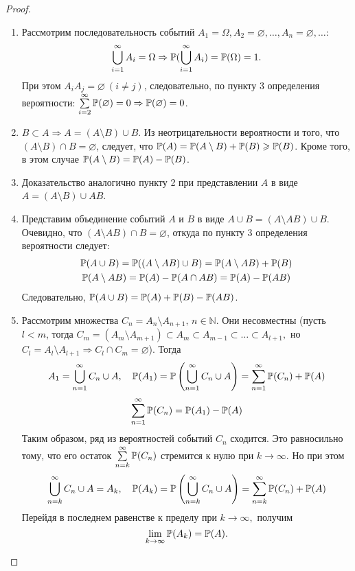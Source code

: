 \begin{proof}\leavevmode
    \begin{enumerate}
    \item Рассмотрим последовательность событий $A_{1} = \Omega, A_{2} = \varnothing, \ldots, A_{n} = \varnothing, \ldots$:
    \begin{equation*}
        \bigcup\limits_{i=1}^\infty A_i = \Omega \Rightarrow {\mathbb{P}(\bigcup\limits_{i=1}^\infty A_i)} = {\mathbb{P}(\Omega)} = 1.
    \end{equation*}
    При этом $A_{i}A_j = \varnothing~(i \ne j)$, следовательно, по пункту 3 определения вероятности: $\sum\limits_{i=2}^\infty {\mathbb{P}(\varnothing)} = 0 \Rightarrow {\mathbb{P}(\varnothing)} = 0$.
    \item $B \subset A \Rightarrow A = (A \setminus B) \cup B$. Из неотрицательности вероятности и того, что $(A \setminus B) \cap B = \varnothing$, следует, что ${\mathbb{P}(A)} = {\mathbb{P}(A \setminus B)} + {\mathbb{P}(B)} \geqslant {\mathbb{P}(B)}$. Кроме того, в этом случае ${\mathbb{P}(A \setminus B)} = {\mathbb{P}(A)} - {\mathbb{P}(B)}$.
    \item Доказательство аналогично пункту 2 при представлении $A$ в виде $A = (A \setminus B) \cup AB$.
    \item Представим объединение событий $A$ и $B$ в виде $A \cup B = (A \setminus AB) \cup B$. Очевидно, что $(A \setminus AB) \cap B = \varnothing$, откуда по пункту 3 определения вероятности следует:
    \begin{gather*}
        {\mathbb{P}(A \cup B)} = {\mathbb{P}((A \setminus AB) \cup B)} = {\mathbb{P}(A \setminus AB)} + {\mathbb{P}(B)} \\
        {\mathbb{P}(A \setminus AB)} = {\mathbb{P}(A)} - {\mathbb{P}(A \cap AB)} = {\mathbb{P}(A)} - {\mathbb{P}(AB)}
    \end{gather*}
    Следовательно, ${\mathbb{P}(A \cup B)} = {\mathbb{P}(A)} + {\mathbb{P}(B)} - {\mathbb{P}(AB)}$.
    \item Рассмотрим множества $C_n = A_n \setminus A_{n+1}, \, n \in \mathbb{N}$. Они несовместны (пусть $l < m$, тогда $C_m = (A_m \setminus A_{m+1}) \subset A_m \subset A_{m-1} \subset \ldots \subset A_{l+1},$ но $C_l = A_l \setminus A_{l+1} \Rightarrow C_l \cap C_m = \varnothing$). Тогда
    $$A_1 = \bigcup\limits_{n = 1}^{\infty} C_n \cup A, \quad {\mathbb{P}(A_1)} = \mathbb{P}\left({\bigcup\limits_{n = 1}^{\infty} C_n \cup A}\right) = \sum\limits_{n=1}^{\infty} {\mathbb{P}(C_n)} + {\mathbb{P}(A)} $$
    $$ \sum\limits_{n=1}^{\infty} {\mathbb{P}(C_n)} = {\mathbb{P}(A_1)} - {\mathbb{P}(A)}$$
    Таким образом, ряд из вероятностей событий $C_n$ сходится. Это равносильно тому, что его остаток $\sum\limits_{n=k}^{\infty} {\mathbb{P}(C_n)}$ стремится к нулю при $k \rightarrow \infty$. Но при этом
    $$ \bigcup\limits_{n = k}^{\infty} C_n \cup A = A_k, \quad {\mathbb{P}(A_k)} = \mathbb{P}\left({\bigcup\limits_{n = k}^{\infty} C_n \cup A}\right) = \sum\limits_{n=k}^{\infty} {\mathbb{P}(C_n)} + {\mathbb{P}(A)} $$
    Перейдя в последнем равенстве к пределу при $k \rightarrow \infty,$ получим
    $$ \lim_{k \to \infty} {\mathbb{P}(A_k)} = {\mathbb{P}(A)}.$$

\end{enumerate}
\end{proof}

